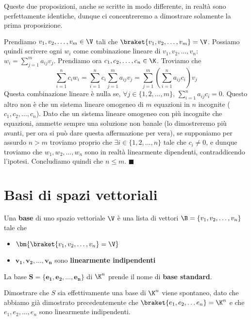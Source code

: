 \documentclass[11pt, a4paper, titlepage, oneside]{scrbook}
\begin{document}
\Dimostrazione \nopagebreak

Queste due proposizioni, anche se scritte in modo differente, in realtà sono perfettamente identiche, dunque ci concentreremo a dimostrare solamente la prima proposizione.

Prendiamo $v_1, v_2, \ldots, v_m \in \V$ tali che $\braket{v_1, v_2, \ldots, v_m} = \V$. Possiamo quindi scrivere ogni $w_i$ come combinazione lineare di $v_1, v_2, \ldots, v_n$: $w_i = \sum_{j = 1}^m a_{ij} v_j$. Prendiamo ora $c_1, c_2, \ldots, c_n \in \K$. Troviamo che 
\[\sum_{i = 1}^n c_i w_i = \sum_{i = 1}^n c_i \sum_{j = 1}^m a_{ij} v_j = \sum_{j = 1}^m \left(\sum_{i = 1}^n a_{ij}  c_i\right)v_j\]
Questa combinazione lineare è nulla se, $\forall j \in \{1, 2, \ldots, m\}$, $\sum_{i = 1}^n a_{ij}c_i = 0$. Questo altro non è che un sistema lineare omogeneo di $m$ equazioni in $n$ incognite ($c_1, c_2, \ldots, c_n$). Dato che un sistema lineare omogeneo con più incognite che equazioni, ammette sempre una soluzione non banale (lo dimostreremo più avanti, per ora si può dare questa affermazione per vera), se supponiamo per assurdo $n > m$ troviamo proprio che $\exists i \in \{1,2,\ldots,n\}$ tale che $c_i \neq 0$, e dunque troviamo che $w_1, w_2, \ldots, w_n$ sono in realtà linearmente dipendenti, contraddicendo l'ipotesi. Concludiamo quindi che $n \leq m$. $\blacksquare$

\section{Basi di spazi vettoriali}

\begin{Definizione}[Base]
\label{def-base}
Una \textbf{base} di uno spazio vettoriale $\V$ è una lista di vettori $\B = \{v_1, v_2, \ldots, v_n\}$ tale che
\begin{itemize}
    \item $\bm{\braket{v_1, v_2, \ldots, v_n} = \V}$
    \item $\bm{v_1, v_2, \ldots, v_n}$ sono \textbf{linearmente indipendenti}
\end{itemize}
\end{Definizione}

\begin{Definizione}
\label{def-base-standard}
La base $\bm{S = \{e_1, e_2, \ldots, e_n\}}$ di $\K^n$ prende il nome di \textbf{base standard}.
\end{Definizione}
Dimostrare che $S$ sia effettivamente una base di $\K^n$ viene spontaneo, dato che abbiamo già dimostrato precedentemente che $\braket{e_1, e_2, \ldots e_n} = \K^n$ e che $e_1, e_2, \ldots, e_n$ sono linearmente indipendenti.
\end{document}
